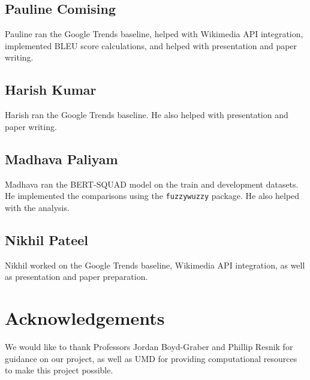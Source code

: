 \documentclass{article}
\begin{document}
\subsection{Pauline Comising}
Pauline ran the Google Trends baseline, helped with Wikimedia API integration, implemented BLEU score calculations, and helped with presentation and paper writing.
\subsection{Harish Kumar}
Harish ran the Google Trends baseline. He also helped with presentation and paper writing.
\subsection{Madhava Paliyam}
Madhava ran the BERT-SQUAD model on the train and development datasets. He implemented the comparisons using the {\tt fuzzywuzzy} package. He also helped with the analysis. 

\subsection{Nikhil Pateel}
Nikhil worked on the Google Trends baseline, Wikimedia API integration, as well as presentation and paper preparation.


\section*{Acknowledgements}

We would like to thank Professors Jordan Boyd-Graber and Phillip Resnik for guidance on our project, as well as UMD for providing computational resources to make this project possible.




\end{document}
